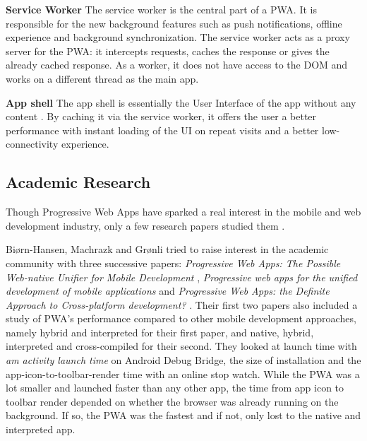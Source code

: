 \documentclass{kththesis}
\begin{document}
\medskip
\textbf{Service Worker} \newline
The service worker is the central part of a PWA. It is responsible for the new background features such as push notifications, offline experience and background synchronization\cite{SW_def}. The service worker acts as a proxy server for the PWA: it intercepts requests, caches the response or gives the already cached response. As a worker, it does not have access to the DOM and works on a different thread as the main app. 

\medskip
\textbf{App shell} \newline
The app shell is essentially the User Interface of the app without any content \cite{AppShell_def}. By caching it via the service worker, it offers the user a better performance with instant loading of the UI on repeat visits and a better low-connectivity experience.

\subsection{Academic Research} 


Though Progressive Web Apps have sparked a real interest in the mobile and web development industry, only a few research papers studied them\cite{PWApossibleUnifer} \cite{Biorn-Hansen2} \cite{Biorn-Hansen3}.

Biørn-Hansen, Machrazk and Grønli tried to raise interest in the academic community with three successive papers: \textit{Progressive Web Apps: The Possible Web-native Unifier for Mobile Development} \cite{PWApossibleUnifer}, \textit{Progressive web apps for the unified development of mobile applications} \cite{Biorn-Hansen3} and \textit{Progressive Web Apps: the Definite Approach to Cross-platform development?} \cite{Biorn-Hansen3}. Their first two papers also included a study of PWA's performance compared to other mobile development approaches, namely hybrid and interpreted for their first paper, and native, hybrid, interpreted and cross-compiled for their second. They looked at launch time with \textit{am activity launch time} on Android Debug Bridge, the size of installation and the app-icon-to-toolbar-render time with an online stop watch. While the PWA was a lot smaller and launched faster than any other app, the time from app icon to toolbar render depended on whether the browser was already running on the background. If so, the PWA was the fastest and if not, only lost to the native and interpreted app. 
\end{document}
